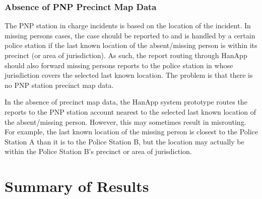 \subsubsection{\textbf{Absence of PNP Precinct Map Data}}

The PNP station in charge incidents is based on the location of the incident. In missing persons cases, the case should be reported to and is handled by a certain police station if the last known location of the absent/missing person is within its precinct (or area of jurisdiction). As such, the report routing through HanApp should also forward missing persons reports to the police station in whose jurisdiction covers the selected last known location. The problem is that there is no PNP station precinct map data.

In the absence of precinct map data, the HanApp system prototype routes the reports to the PNP station account nearest to the selected last known location of the absent/missing person. However, this may sometimes result in misrouting. For example, the last known location of the missing person is closest to the Police Station A than it is to the Police Station B, but the location may actually be within the Police Station B’s precinct or area of jurisdiction.

\newpage
\section{Summary of Results}

